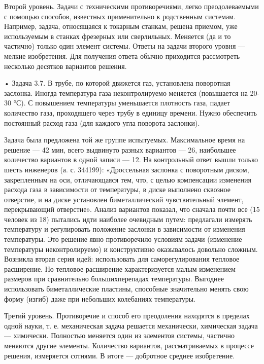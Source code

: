 Второй   уровень.   Задачи   с  техническими   противоречиями,   легко
преодолеваемыми   с  помощью   способов,  известных   применительно  к
родственным  системам.   Например,  задача,  относящаяся   к  токарным
станкам,  решена приемом,  уже  используемым в  станках фрезерных  или
сверлильных. Меняется (да и то  частично) только один элемент системы.
Ответы на  задачи второго уровня  — мелкие изобретения.  Для получения
ответа  обычно  приходится  рассмотреть несколько  десятков  вариантов
решения.

• Задача 3.7. В трубе, по которой движется газ, установлена поворотная
заслонка. Иногда температура газа неконтролируемо меняется (повышается
на  20-30 °С).  С повышением  температуры уменьшается  плотность газа,
падает  количество газа,  проходящего через  трубу в  единицу времени.
Нужно  обеспечить постоянный  расход газа  (для каждого  угла поворота
заслонки).

Задача  была   предложена  той  же  группе   испытуемых.  Максимальное
время  на  решение  —  42  мин, всего  выдвинуто  разных  вариантов  —
26,  наибольшее  количество   вариантов  в  одной  записи   —  12.  На
контрольный  ответ  вышли  только  шесть  инженеров  (а.  с.  344199):
«Дроссельная  заслонка  с  поворотным  диском,  закрепленным  на  оси,
отличающаяся тем,  что, с целью  компенсации изменения расхода  газа в
зависимости  от температуры,  в  диске  выполнено сквозное  отверстие,
и   на  диске   установлен  биметаллический   чувствительный  элемент,
перекрывающий  отверстие».  Анализ   вариантов  показал,  что  сначала
почти  все  (15  человек  из  18)  пытались  идти  наиболее  очевидным
путем:  предлагали  измерять   температуру  и  регулировать  положение
заслонки  в зависимости  от  изменения температуры.  Это решение  явно
противоречило условиям задачи  (изменение температуры неконтролируемо)
и конструктивно  оказывалось довольно  сложным. Возникла  вторая серия
идей:  использовать  для  саморегулирования  тепловое  расширение.  Но
тепловое  расширение  характеризуется  малым изменением  размеров  при
сравнительно   большихперепадах  температуры.   Выгоднее  использовать
биметаллические  пластины,  способные  значительно менять  свою  форму
(изгиб) даже при небольших колебаниях температуры.

Третий  уровень. Противоречие  и  способ его  преодоления находятся  в
пределах одной науки, т.  е. механическая задача решается механически,
химическая задача  — химически.  Полностью меняется один  из элементов
системы,  частично  меняются  другие элементы.  Количество  вариантов,
рассматриваемых  в процессе  решения,  измеряется сотнями.  В итоге  —
добротное среднее изобретение.

